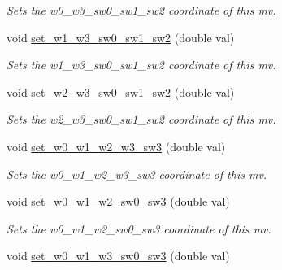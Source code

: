 \begin{DoxyCompactItemize}
\begin{DoxyCompactList}\small\item\em Sets the w0\-\_\-w3\-\_\-sw0\-\_\-sw1\-\_\-sw2 coordinate of this mv. \end{DoxyCompactList}\item 
\hypertarget{classe3ga_1_1mv_a193a537c854c4aa5eb8db34c3a23fae9}{void \hyperlink{classe3ga_1_1mv_a193a537c854c4aa5eb8db34c3a23fae9}{set\-\_\-w1\-\_\-w3\-\_\-sw0\-\_\-sw1\-\_\-sw2} (double val)}\label{classe3ga_1_1mv_a193a537c854c4aa5eb8db34c3a23fae9}

\begin{DoxyCompactList}\small\item\em Sets the w1\-\_\-w3\-\_\-sw0\-\_\-sw1\-\_\-sw2 coordinate of this mv. \end{DoxyCompactList}\item 
\hypertarget{classe3ga_1_1mv_aaebe786133b9f8ccec085a25634b5845}{void \hyperlink{classe3ga_1_1mv_aaebe786133b9f8ccec085a25634b5845}{set\-\_\-w2\-\_\-w3\-\_\-sw0\-\_\-sw1\-\_\-sw2} (double val)}\label{classe3ga_1_1mv_aaebe786133b9f8ccec085a25634b5845}

\begin{DoxyCompactList}\small\item\em Sets the w2\-\_\-w3\-\_\-sw0\-\_\-sw1\-\_\-sw2 coordinate of this mv. \end{DoxyCompactList}\item 
\hypertarget{classe3ga_1_1mv_a6480715bfca3d2e18c32a3ab0e4c1fdc}{void \hyperlink{classe3ga_1_1mv_a6480715bfca3d2e18c32a3ab0e4c1fdc}{set\-\_\-w0\-\_\-w1\-\_\-w2\-\_\-w3\-\_\-sw3} (double val)}\label{classe3ga_1_1mv_a6480715bfca3d2e18c32a3ab0e4c1fdc}

\begin{DoxyCompactList}\small\item\em Sets the w0\-\_\-w1\-\_\-w2\-\_\-w3\-\_\-sw3 coordinate of this mv. \end{DoxyCompactList}\item 
\hypertarget{classe3ga_1_1mv_a4787ff208f8b9f4b6fe80055d8f75e15}{void \hyperlink{classe3ga_1_1mv_a4787ff208f8b9f4b6fe80055d8f75e15}{set\-\_\-w0\-\_\-w1\-\_\-w2\-\_\-sw0\-\_\-sw3} (double val)}\label{classe3ga_1_1mv_a4787ff208f8b9f4b6fe80055d8f75e15}

\begin{DoxyCompactList}\small\item\em Sets the w0\-\_\-w1\-\_\-w2\-\_\-sw0\-\_\-sw3 coordinate of this mv. \end{DoxyCompactList}\item 
\hypertarget{classe3ga_1_1mv_a5dfceb519224dfcb2a3fe5e3b48e3755}{void \hyperlink{classe3ga_1_1mv_a5dfceb519224dfcb2a3fe5e3b48e3755}{set\-\_\-w0\-\_\-w1\-\_\-w3\-\_\-sw0\-\_\-sw3} (double val)}\label{classe3ga_1_1mv_a5dfceb519224dfcb2a3fe5e3b48e3755}


\end{DoxyCompactItemize}
